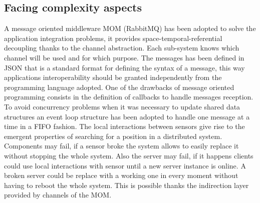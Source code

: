\documentclass[11pt]{article}
\begin{document}
\subsection{Facing complexity aspects}
A message oriented middleware MOM (RabbitMQ) has been adopted to solve the application integration problems, it provides space-temporal-referential decoupling thanks to the channel abstraction. Each sub-system knows which channel will be used and for which purpose. The messages has been defined in JSON that is a standard format for defining the syntax of a message, this way applications interoperability should be granted independently from the programming language adopted. One of the drawbacks of message oriented programming consists in the definition of callbacks to handle messages reception. To avoid concurrency problems when it was necessary to update shared data structures an event loop structure has been adopted to handle one message at a time in a FIFO fashion. The local interactions between sensors give rise to the emergent properties of searching for a position in a distributed system. Components may fail, if a sensor broke the system allows to easily replace it without stopping the whole system. Also the server may fail, if it happens clients could use local interactions with sensor until a new server instance is online. A broken server could be replace with a working one in every moment without having to reboot the whole system. This is possible thanks the indirection layer provided by channels of the MOM.
\end{document}
